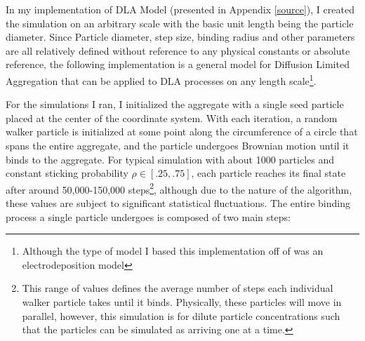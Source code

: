 \documentclass{article}
\begin{document}
In my implementation of DLA Model (presented in Appendix \ref{source}), I created the simulation on an arbitrary scale with the basic unit length being the particle diameter. Since Particle diameter, step size, binding radius and other parameters are all relatively defined without reference to any physical constants or absolute reference, the following implementation is a general model for Diffusion Limited Aggregation that can be applied to DLA processes on any length scale\footnote{Although the type of model I based this implementation off of was an electrodeposition model}.

For the simulations I ran, I initialized the aggregate with a single seed particle placed at the center of the coordinate system. With each iteration, a random walker particle is initialized at some point along the circumference of a circle that spans the entire aggregate, and the particle undergoes Brownian motion until it binds to the aggregate. For typical simulation with about 1000 particles and constant sticking probability $\rho \in [.25, .75]$, each particle reaches its final state after around 50,000-150,000 steps\footnote{This range of values defines the average number of steps each individual walker particle takes until it binds. Physically, these particles will move in parallel, however, this simulation is for dilute particle concentrations such that the particles can be simulated as arriving one at a time.}, although due to the nature of the algorithm, these values are subject to significant statistical fluctuations. The entire binding process a single particle undergoes is composed of two main steps:
\end{document}

